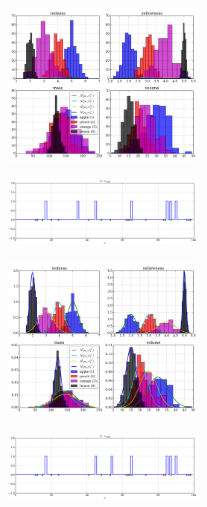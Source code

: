 \begin{multicols}{2}
\begin{figure}[H]
  \centering
		\includegraphics[width=0.45\textwidth]{images/not_normed_original.png}
\end{figure}
\vspace{5mm}

\begin{figure}[H]
  \centering
		\includegraphics[width=0.45\textwidth]{images/results_original_not_normed.png}
\end{figure}
\vspace{5mm}

\begin{figure}[H]
  \centering
		\includegraphics[width=0.45\textwidth]{images/normed_original.png}
\end{figure}
\vspace{5mm}

\begin{figure}[H]
  \centering
		\includegraphics[width=0.45\textwidth]{images/results_original_normed.png}
\end{figure}
\vspace{5mm}


\end{multicols}
